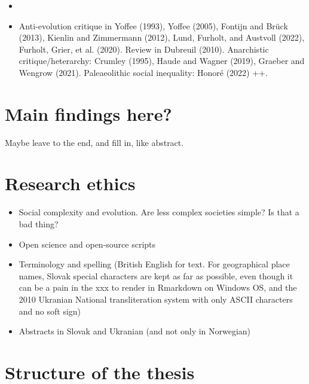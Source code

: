 \documentclass[
  12pt,
]{book}
\providecommand{\tightlist}{%
  \setlength{\itemsep}{0pt}\setlength{\parskip}{0pt}}
\begin{document}
\begin{itemize}
\tightlist
\item
\end{itemize}

\begin{itemize}
\tightlist
\item
  Anti-evolution critique in Yoffee (1993), Yoffee (2005), Fontijn and Brück (2013), Kienlin and Zimmermann (2012), Lund, Furholt, and Austvoll (2022), Furholt, Grier, et al. (2020). Review in Dubreuil (2010). Anarchistic critique/heterarchy: Crumley (1995), Haude and Wagner (2019), Graeber and Wengrow (2021). Paleaeolithic social inequality: Honoré (2022) ++.
\end{itemize}

\hypertarget{main-findings-here}{%
\section{Main findings here?}\label{main-findings-here}}

Maybe leave to the end, and fill in, like abstract.

\hypertarget{research-ethics}{%
\section{Research ethics}\label{research-ethics}}

\begin{itemize}
\item
  Social complexity and evolution. Are less complex societies simple? Is that a bad thing?
\item
  Open science and open-source scripts
\item
  Terminology and spelling (British English for text. For geographical place names, Slovak special characters are kept as far as possible, even though it can be a pain in the xxx to render in Rmarkdown on Windows OS, and the 2010 Ukranian National transliteration system with only ASCII characters and no soft sign)
\item
  Abstracts in Slovak and Ukranian (and not only in Norwegian)
\end{itemize}

\hypertarget{structure-of-the-thesis}{%
\section{Structure of the thesis}\label{structure-of-the-thesis}}
\end{document}
